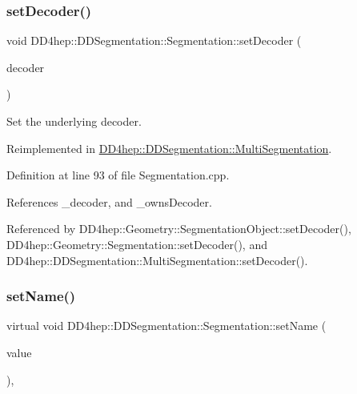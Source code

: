 \hypertarget{class_d_d4hep_1_1_d_d_segmentation_1_1_segmentation_ab5973bc06538d13b1991f55e40635fa0}{}\label{class_d_d4hep_1_1_d_d_segmentation_1_1_segmentation_ab5973bc06538d13b1991f55e40635fa0} 
\subsubsection{\texorpdfstring{set\+Decoder()}{setDecoder()}}
{\footnotesize\ttfamily void D\+D4hep\+::\+D\+D\+Segmentation\+::\+Segmentation\+::set\+Decoder (\begin{DoxyParamCaption}\item[{\hyperlink{class_d_d4hep_1_1_d_d_segmentation_1_1_bit_field64}{Bit\+Field64} $\ast$}]{decoder }\end{DoxyParamCaption})\hspace{0.3cm}{\ttfamily [virtual]}}



Set the underlying decoder. 



Reimplemented in \hyperlink{class_d_d4hep_1_1_d_d_segmentation_1_1_multi_segmentation_a21a046717c1aae25d103dddeb2829cb9}{D\+D4hep\+::\+D\+D\+Segmentation\+::\+Multi\+Segmentation}.



Definition at line 93 of file Segmentation.\+cpp.



References \+\_\+decoder, and \+\_\+owns\+Decoder.



Referenced by D\+D4hep\+::\+Geometry\+::\+Segmentation\+Object\+::set\+Decoder(), D\+D4hep\+::\+Geometry\+::\+Segmentation\+::set\+Decoder(), and D\+D4hep\+::\+D\+D\+Segmentation\+::\+Multi\+Segmentation\+::set\+Decoder().

\hypertarget{class_d_d4hep_1_1_d_d_segmentation_1_1_segmentation_a9bfa16e70ac68d6013c49be45b3438c3}{}\label{class_d_d4hep_1_1_d_d_segmentation_1_1_segmentation_a9bfa16e70ac68d6013c49be45b3438c3} 
\subsubsection{\texorpdfstring{set\+Name()}{setName()}}
{\footnotesize\ttfamily virtual void D\+D4hep\+::\+D\+D\+Segmentation\+::\+Segmentation\+::set\+Name (\begin{DoxyParamCaption}\item[{const std\+::string \&}]{value }\end{DoxyParamCaption})\hspace{0.3cm}{\ttfamily [inline]}, {\ttfamily [virtual]}}



